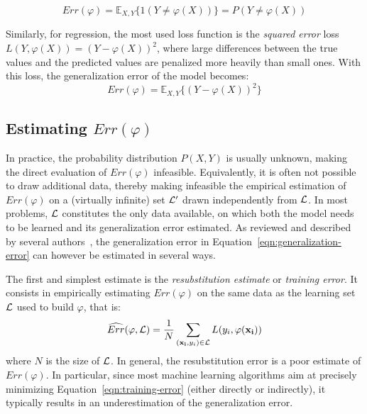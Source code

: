 \begin{equation}
Err(\varphi) = \mathbb{E}_{X, Y}\{ 1(Y \neq \varphi(X)) \} = P(Y \neq \varphi(X))
\end{equation}

Similarly, for regression, the most used loss function is the \textit{squared
error} loss $L(Y, \varphi(X)) = (Y - \varphi(X))^2$, where large differences
between the true values and the predicted values are penalized more heavily
than small ones. With this loss, the generalization error of the model becomes:
\begin{equation}
Err(\varphi) = \mathbb{E}_{X, Y}\{ (Y - \varphi(X))^2 \}
\end{equation}

\subsection{Estimating $Err(\varphi)$}

In practice, the probability distribution $P(X, Y)$ is usually unknown, making
the direct evaluation of $Err(\varphi)$ infeasible. Equivalently, it is often
not possible to draw additional data, thereby making infeasible the empirical
estimation of $Err(\varphi)$ on a (virtually infinite) set ${\cal L}'$ drawn
independently from ${\cal L}$. In most problems, ${\cal L}$ constitutes the
only data available, on which both the model needs to be learned and its
generalization error estimated.
As reviewed and described by several
authors~\citep{toussaint:1974,nadeau:2003,arlot:2010}, the generalization error
in Equation~\ref{eqn:generalization-error} can however be estimated in several ways.

The first and simplest estimate is the \textit{resubstitution estimate} or \textit{training error}. It
consists in empirically estimating $Err(\varphi)$ on the same data as the
learning set ${\cal L}$ used to build $\varphi$, that is:
\begin{equation}\label{eqn:training-error}
\widehat{Err}(\varphi, {\cal L}) = \frac{1}{N} \sum_{(\mathbf{x_i}, y_i) \in {\cal L}} L(y_i, \varphi(\mathbf{x_i}))
\end{equation}
where $N$ is the size of ${\cal L}$.
In general, the resubstitution error is a poor estimate of
$Err(\varphi)$. In particular, since most machine learning algorithms
aim at precisely minimizing Equation~\ref{eqn:training-error} (either directly
or indirectly), it typically results in an underestimation of the
generalization error.

